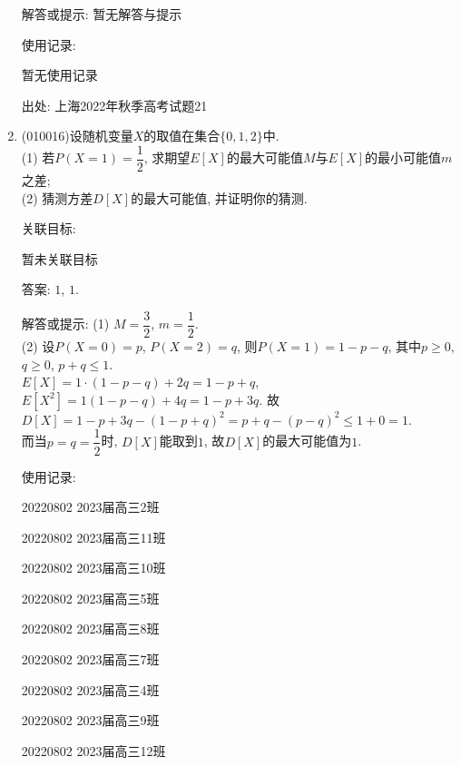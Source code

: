 \documentclass[10pt,a4paper]{article}
\begin{document}
\begin{enumerate}[1.]
解答或提示: 暂无解答与提示

使用记录:

暂无使用记录


出处: 上海2022年秋季高考试题21
\item { (010016)}设随机变量$X$的取值在集合$\{0,1,2\}$中.\\
(1) 若$P(X=1)=\dfrac 12$, 求期望$E[X]$的最大可能值$M$与$E[X]$的最小可能值$m$之差;\\
(2) 猜测方差$D[X]$的最大可能值, 并证明你的猜测.


关联目标:

暂未关联目标

答案: $1$, $1$.

解答或提示: (1) $M=\dfrac 32$, $m=\dfrac 12$.\\
(2) 设$P(X=0)=p$, $P(X=2)=q$, 则$P(X=1)=1-p-q$, 其中$p\ge 0$, $q\ge 0$, $p+q\le 1$.\\
$E[X]=1\cdot (1-p-q)+2q=1-p+q$, $E[X^2]=1(1-p-q)+4q=1-p+3q$. 故$D[X]=1-p+3q-(1-p+q)^2=p+q-(p-q)^2\le 1+0=1$.\\
而当$p=q=\dfrac 12$时, $D[X]$能取到$1$, 故$D[X]$的最大可能值为$1$.

使用记录:

20220802	2023届高三2班		

20220802	2023届高三11班		

20220802	2023届高三10班		

20220802	2023届高三5班		

20220802	2023届高三8班		

20220802	2023届高三7班		

20220802	2023届高三4班		

20220802	2023届高三9班		

20220802	2023届高三12班		


\end{enumerate}
\end{document}
